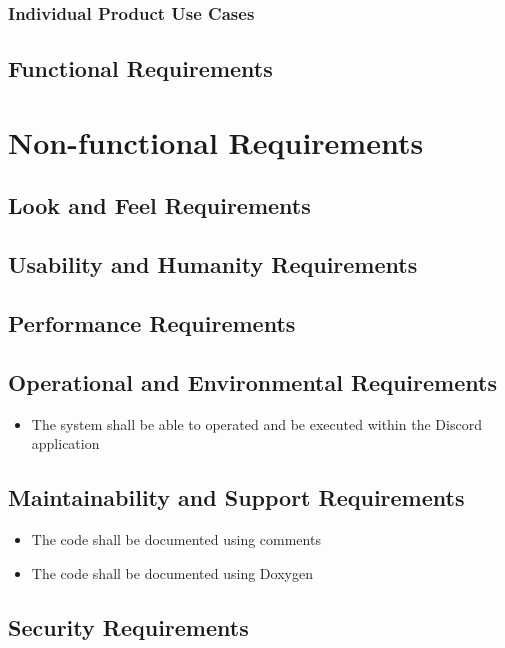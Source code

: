 \documentclass[12pt, titlepage]{article}
\begin{document}
\subsubsection{Individual Product Use Cases}

\subsection{Functional Requirements}

\section{Non-functional Requirements}

\subsection{Look and Feel Requirements}

\subsection{Usability and Humanity Requirements}

\subsection{Performance Requirements}

\subsection{Operational and Environmental Requirements}
\begin{itemize}
    \item The system shall be able to operated and be executed within the Discord application
\end{itemize}

\subsection{Maintainability and Support Requirements}
\begin{itemize}
    \item The code shall be documented using comments
    \item The code shall be documented using Doxygen
\end{itemize}

\subsection{Security Requirements}
\end{document}
